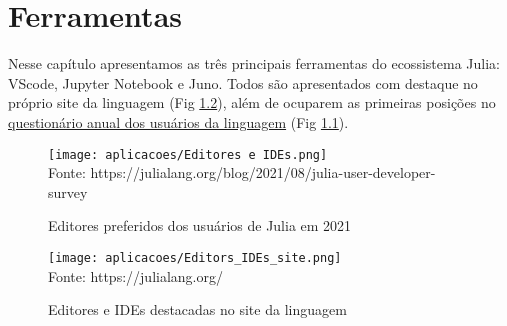 %

\chapter{Ferramentas}
Nesse capítulo apresentamos as três principais ferramentas do ecossistema Julia: VScode, Jupyter Notebook e Juno. 
Todos são apresentados com destaque no próprio site da linguagem (Fig \ref{julia_editors_site}), além de ocuparem as primeiras posições no \href{https://julialang.org/blog/2021/08/julia-user-developer-survey/}{questionário anual dos usuários da linguagem} (Fig \ref{julia_editors_survey}).%

\begin{figure}[H]
\begin{center}
    \caption{Editores preferidos dos usuários de Julia em 2021} \label{julia_editors_survey}
    \texttt{[image: aplicacoes/Editores e IDEs.png]} \\
    {\tiny \sf Fonte: https://julialang.org/blog/2021/08/julia-user-developer-survey }
\end{center}
\end{figure} 

\begin{figure}[H]
\begin{center}
    \caption{Editores e IDEs destacadas no site da linguagem} \label{julia_editors_site}
    \texttt{[image: aplicacoes/Editors\_IDEs\_site.png]} \\
    {\tiny \sf Fonte: https://julialang.org/}
\end{center}
\end{figure} 
   
